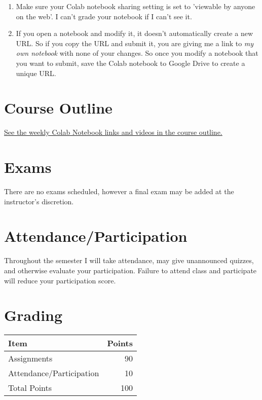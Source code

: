 \documentclass[11pt]{article}
\begin{document}
\begin{enumerate}
\item Make sure your Colab notebook sharing setting is set to 'viewable by anyone on the web'.  I can't grade your notebook if I can't see it.
\item If you open a notebook and modify it, it doesn't automatically create a new URL.  So if you copy the URL and submit it, you are giving me a link to \emph{my own notebook} with none of your changes. So once you modify a notebook that you want to submit, save the Colab notebook to Google Drive to create a unique URL.
\end{enumerate}
\section{Course Outline}
\label{sec:org5d51f63}

\href{https://financial-education.github.io/python\_for\_finance\_outline/}{See the weekly Colab Notebook links and videos in the course outline.}
\section{Exams}
\label{sec:org7fedf6c}

There are no exams scheduled, however a final exam may be added at the instructor's discretion. 
\section{Attendance/Participation}
\label{sec:orgb88492e}

Throughout the semester I will take attendance, may give unannounced quizzes, and otherwise evaluate your participation.  Failure to attend class and participate will reduce your participation score.
\section{Grading}
\label{sec:orgcd0b4cb}

\begin{center}


\begin{center}
\begin{tabular}{lr}
Item & Points\\
\hline
Assignments & 90\\
Attendance/Participation & 10\\
\hline
Total Points & 100\\
\hline
\end{tabular}
\end{center}
\end{center}
\end{document}
